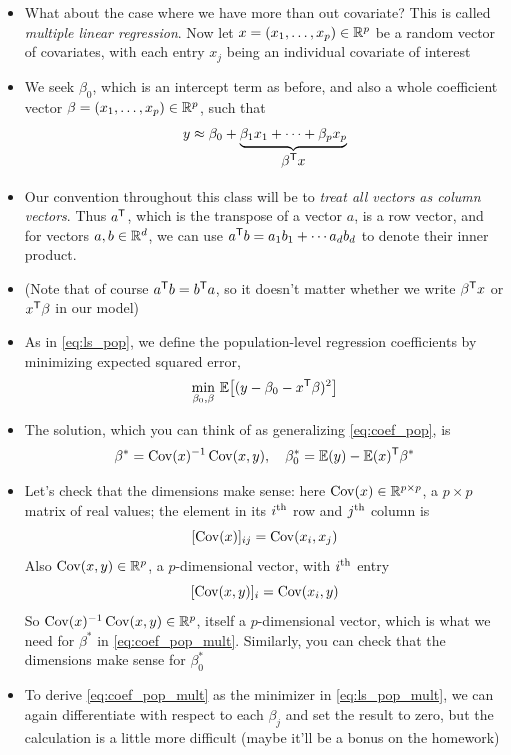 \documentclass{article}
\begin{document}
\begin{itemize}
\item What about the case where we have more than out covariate? This is called
  \emph{multiple linear regression}. Now let $x  = (x_1, \dots, x_p) \in \mathbb{R}^p$
  be a random vector of covariates, with each entry $x_j$ being an individual
  covariate of interest

\item We seek $\beta_0$, which is an intercept term as before, and also a whole 
  coefficient vector $\beta = (x_1, \dots, x_p) \in \mathbb{R}^p$, such that 
  \[
  y \approx \beta_0 + \underbrace{\beta_1 x_1 + \cdots + \beta_p
    x_p}_{\textstyle \begin{array}{c} \beta^{\mathsf{T}} x \end{array}}
  \]

\item Our convention throughout this class will be to \emph{treat all vectors as 
    column vectors}. Thus $a^{\mathsf{T}}$, which is the transpose of a vector $a$, is a
  row vector, and for vectors $a,b \in \mathbb{R}^d$, we can use $a^{\mathsf{T}} b = a_1 b_1 +
  \cdots a_d b_d$ to denote their inner product. 

\item (Note that of course $a^{\mathsf{T}} b = b^{\mathsf{T}} a$, so it doesn't matter whether we
  write $\beta^{\mathsf{T}} x$ or $x^{\mathsf{T}} \beta$ in our model)

\item As in \eqref{eq:ls_pop}, we define the population-level regression
  coefficients by minimizing expected squared error,   
  \begin{equation}
  \label{eq:ls_pop_mult}
  \min_{\beta_0, \beta} \, \mathbb{E}\big[ (y - \beta_0 - x^{\mathsf{T}} \beta)^2 \big]
  \end{equation}

\item The solution, which you can think of as generalizing \eqref{eq:coef_pop},
  is 
  \begin{equation}
  \label{eq:coef_pop_mult}
  \beta^* = \operatorname{Cov}(x)^{-1} \operatorname{Cov}(x, y), \quad 
  \beta^*_0 = \mathbb{E}(y) - \mathbb{E}(x)^{\mathsf{T}} \beta^*
  \end{equation}

\item  Let's check that the dimensions make sense: here $\operatorname{Cov}(x) \in \mathbb{R}^{p
    \times  p}$, a $p \times p$ matrix of real values; the element in its $i^{\textnormal{th}}$
  row and $j^{\textnormal{th}}$ column is   
  \[
  [\operatorname{Cov}(x)]_{ij} = \operatorname{Cov}(x_i, x_j)
  \]
  Also $\operatorname{Cov}(x, y) \in \mathbb{R}^p$, a $p$-dimensional vector, with $i^{\textnormal{th}}$ entry
  \[
  [\operatorname{Cov}(x, y)]_i = \operatorname{Cov}(x_i, y)
  \]
  So $\operatorname{Cov}(x)^{-1} \operatorname{Cov}(x, y) \in \mathbb{R}^p$, itself a $p$-dimensional vector, which
  is what we need for $\beta^*$ in \eqref{eq:coef_pop_mult}. Similarly, you can
  check that the dimensions make sense for $\beta^*_0$ 

\item To derive \eqref{eq:coef_pop_mult} as the minimizer in
  \eqref{eq:ls_pop_mult}, we can again differentiate with respect to each
  $\beta_j$ and set the result to zero, but the calculation is a little more
  difficult (maybe it'll be a bonus on the homework) 
\end{itemize}
\end{document}
